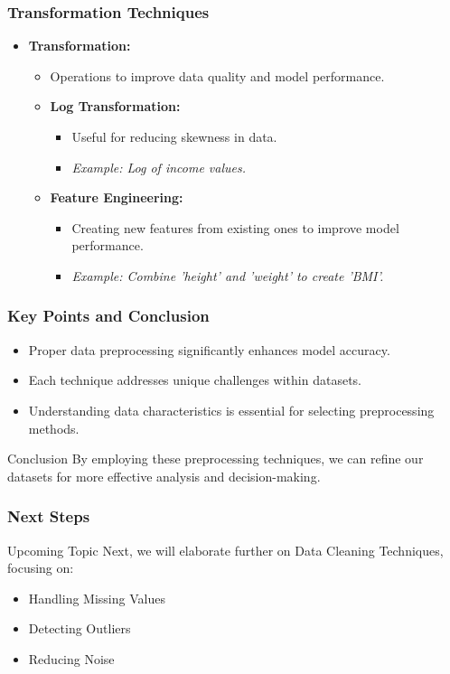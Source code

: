 \documentclass{beamer}
\begin{document}
\begin{frame}[fragile]
    \frametitle{Transformation Techniques}
    \begin{itemize}
        \item \textbf{Transformation:}
        \begin{itemize}
            \item Operations to improve data quality and model performance.
            \item \textbf{Log Transformation:}
                \begin{itemize}
                    \item Useful for reducing skewness in data.
                    \item \textit{Example: Log of income values.}
                \end{itemize}
                
            \item \textbf{Feature Engineering:}
                \begin{itemize}
                    \item Creating new features from existing ones to improve model performance.
                    \item \textit{Example: Combine 'height' and 'weight' to create 'BMI'.}
                \end{itemize}
        \end{itemize}
    \end{itemize}
\end{frame}

\begin{frame}[fragile]
    \frametitle{Key Points and Conclusion}
    \begin{itemize}
        \item Proper data preprocessing significantly enhances model accuracy.
        \item Each technique addresses unique challenges within datasets.
        \item Understanding data characteristics is essential for selecting preprocessing methods.
    \end{itemize}
    \begin{block}{Conclusion}
        By employing these preprocessing techniques, we can refine our datasets for more effective analysis and decision-making.
    \end{block}
\end{frame}

\begin{frame}[fragile]
    \frametitle{Next Steps}
    \begin{block}{Upcoming Topic}
        Next, we will elaborate further on Data Cleaning Techniques, focusing on:
        \begin{itemize}
            \item Handling Missing Values
            \item Detecting Outliers
            \item Reducing Noise
        \end{itemize}
    \end{block}
\end{frame}
\end{document}
